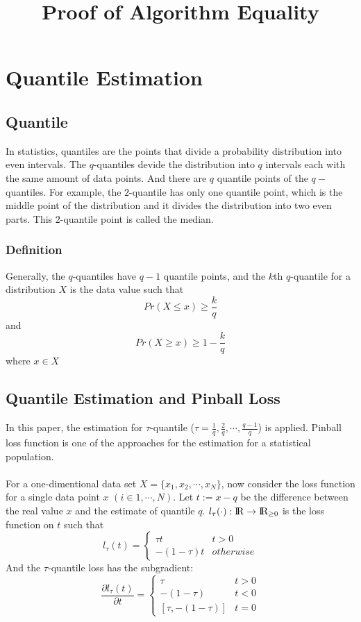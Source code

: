 \documentclass[11pt]{article}
\title{Proof of Algorithm Equality}
\begin{document}
\maketitle
            
\section{Quantile Estimation}

\subsection{Quantile}

In statistics, quantiles are the points that divide a probability distribution into even intervals.
The $q$-quantiles devide the distribution into $q$ intervals each with the same amount of data points.
And there are $q$ quantile points of the $q-$quantiles.
For example, the $2$-quantile has only one quantile point, which is the middle point of the distribution
and it divides the distribution into two even parts. This $2$-quantile point is called the median.


\subsubsection{Definition}
Generally, the $q$-quantiles have $q-1$ quantile points, and the $k$th $q$-quantile for a 
distribution $X$ is the data value such that
$$
Pr(X \leq x) \geq \frac{k}{q}
$$
and
$$
Pr(X \geq x) \geq 1 - \frac{k}{q}
$$
where $x \in X$

\subsection{Quantile Estimation and Pinball Loss}
In this paper, the estimation for $\tau$-quantile 
($\tau =  \frac{1}{q}, \frac{2}{q}, \cdots, \frac{q-1}{q}$)
is applied.
Pinball loss function is one of the approaches for the estimation for a statistical population.
\\\\
For a one-dimentional data set $X = \{x_1, x_2, \cdots, x_N\}$, 
now consider the loss function for a single data point $x$ $(i \in {1, \cdots, N})$.
Let $t := x - q$ be the difference between the real value $x$ and the estimate of quantile $q$.
$l_{\tau}(\cdot): \rm I\!R \to \rm I\!R_{\geq 0}$ is the loss function on $t$ such that
$$
l_\tau(t)= 
    \begin{cases}
        \tau t & t > 0\\
        -(1-\tau) t & otherwise
    \end{cases}
$$
And the $\tau$-quantile loss has the {\color{red} subgradient}:
$$
\frac {\partial l_\tau(t)}{\partial t}= 
    \begin{cases}
        \tau                & t > 0\\
        -(1-\tau)           & t < 0\\
        [\tau, -(1 - \tau)] & t = 0
    \end{cases}
$$
\end{document}
